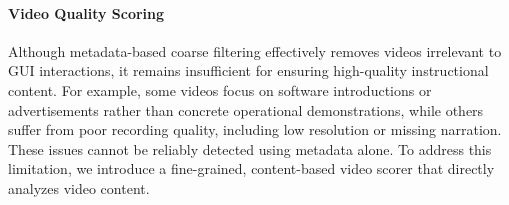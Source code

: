 \documentclass{article}
\theoremstyle{plain}
\theoremstyle{definition}
\theoremstyle{remark}
\newcommand{\lilei}[1]{\textcolor{orange}{#1 -lilei}}
\begin{document}

\paragraph{Video Quality Scoring}
Although metadata-based coarse filtering effectively removes videos irrelevant to GUI interactions, it remains insufficient for ensuring high-quality instructional content. For example, some videos focus on software introductions or advertisements rather than concrete operational demonstrations, while others suffer from poor recording quality, including low resolution or missing narration. These issues cannot be reliably detected using metadata alone. To address this limitation, we introduce a fine-grained, content-based video scorer that directly analyzes video content.

\end{document}
